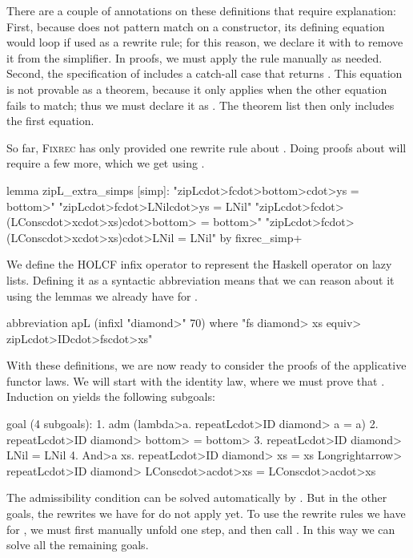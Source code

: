 There are a couple of annotations on these definitions that require explanation: First, because  does not pattern match on a constructor, its defining equation would loop if used as a rewrite rule; for this reason, we declare it with  to remove it from the simplifier. In proofs, we must apply the rule  manually as needed. Second, the specification of  includes a catch-all case that returns . This equation is not provable as a theorem, because it only applies when the other equation fails to match; thus we must declare it as . The theorem list  then only includes the first equation.

So far, \textsc{Fixrec} has only provided one rewrite rule about . Doing proofs about  will require a few more, which we get using .
%
\begin{isacode}
lemma zipL_extra_simps [simp]:
  "zipL\<cdot>f\<cdot>\<bottom>\<cdot>ys = \<bottom>"
  "zipL\<cdot>f\<cdot>LNil\<cdot>ys = LNil"
  "zipL\<cdot>f\<cdot>(LCons\<cdot>x\<cdot>xs)\<cdot>\<bottom> = \<bottom>"
  "zipL\<cdot>f\<cdot>(LCons\<cdot>x\<cdot>xs)\<cdot>LNil = LNil"
by fixrec_simp+
\end{isacode}

We define the HOLCF infix operator  to represent the Haskell operator \hs{(<*>)} on lazy lists. Defining it as a syntactic abbreviation means that we can reason about it using the lemmas we already have for .
%
\begin{isacode}
abbreviation apL (infixl "\<diamond>" 70)
  where "fs \<diamond> xs \<equiv> zipL\<cdot>ID\<cdot>fs\<cdot>xs"
\end{isacode}

With these definitions, we are now ready to consider the proofs of the applicative functor laws. We will start with the identity law, where we must prove that . Induction on  yields the following subgoals:
%
\begin{isacode}
goal (4 subgoals):
 1. adm (\<lambda>a. repeatL\<cdot>ID \<diamond> a = a)
 2. repeatL\<cdot>ID \<diamond> \<bottom> = \<bottom>
 3. repeatL\<cdot>ID \<diamond> LNil = LNil
 4. \<And>a xs. repeatL\<cdot>ID \<diamond> xs = xs \<Longrightarrow> repeatL\<cdot>ID \<diamond> LCons\<cdot>a\<cdot>xs = LCons\<cdot>a\<cdot>xs
\end{isacode}
%
The admissibility condition can be solved automatically by . But in the other goals, the rewrites we have for  do not apply yet. To use the rewrite rules we have for , we must first manually unfold  one step, and then call . In this way we can solve all the remaining goals.

